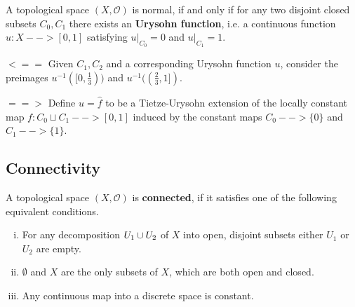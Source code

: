 \begin{corollary}
	A topological space $(X,\mathcal{O})$ is normal, if and only if for any two disjoint closed subsets $C_0,C_1$ there exists an \textbf{Urysohn function}, i.e. a continuous function $u:X --> [0,1]$ satisfying $u\vert_{C_0} = 0$ and $u\vert_{C_1} = 1$.
\end{corollary}
\begin{sketch}
	$<==$ Given $C_1,C_2$ and a corresponding Urysohn function $u$, consider the preimages $u^{-1}([0,\frac{1}{3}))$ and $u^{-1}((\frac{2}{3},1])$.

	$==>$ Define $u = \widehat{f}$ to be a Tietze-Urysohn extension of the locally constant map $f:C_0 \sqcup C_1 --> [0,1]$ induced by the constant maps $C_0 --> \{0\}$ and $C_1 --> \{1\}$.
\end{sketch}





\subsection{Connectivity}

\begin{definition}
	A topological space $(X, \mathcal{O})$ is \textbf{connected}, if it satisfies one of the following equivalent conditions.
	\begin{enumerate}[(i)]
		\item{
			For any decomposition $U_1 \cup U_2$ of $X$ into open,  disjoint subsets either $U_1$ or $U_2$ are empty.
		}
		\item{
			$\emptyset$ and $X$ are the only subsets of $X$, which are both open and closed.
		}
		\item{
			Any continuous map into a discrete space is constant.
		}
	\end{enumerate}
\end{definition}

